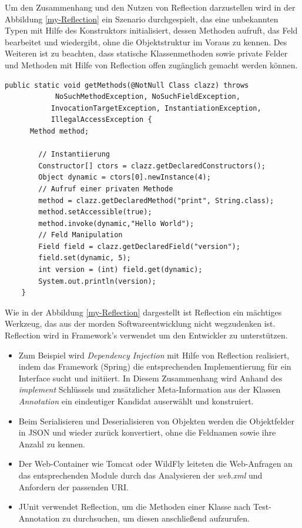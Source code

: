   \bigbreak Um den Zusammenhang und den Nutzen von Reflection darzustellen wird in der Abbildung \ref{my-Reflection} ein Szenario durchgespielt, das eine unbekannten Typen mit Hilfe des Konstruktors initialisiert, dessen Methoden aufruft, das Feld bearbeitet und wiedergibt, ohne die Objektstruktur im Voraus zu kennen. 
  Des Weiteren ist zu beachten, dass statische Klassenmethoden sowie private Felder und Methoden mit Hilfe von Reflection offen zugänglich gemacht werden können.
  \bigbreak 
  \begin{lstlisting}[caption=Reflection in Aktion,label=my-Reflection,captionpos=b]
    public static void getMethods(@NotNull Class clazz) throws
            NoSuchMethodException, NoSuchFieldException,
           InvocationTargetException, InstantiationException,
           IllegalAccessException {
      Method method;

        // Instantiierung
        Constructor[] ctors = clazz.getDeclaredConstructors();
        Object dynamic = ctors[0].newInstance(4);
        // Aufruf einer privaten Methode
        method = clazz.getDeclaredMethod("print", String.class);
        method.setAccessible(true);
        method.invoke(dynamic,"Hello World");
        // Feld Manipulation
        Field field = clazz.getDeclaredField("version");
        field.set(dynamic, 5);
        int version = (int) field.get(dynamic);
        System.out.println(version);
    }
  \end{lstlisting}

  Wie in der Abbildung \ref{my-Reflection} dargestellt ist Reflection ein mächtiges Werkzeug, das aus der morden Softwareentwicklung nicht wegzudenken ist. Reflection wird in Framework's verwendet um den Entwickler zu unterstützen. 
  \begin{itemize}
    \item Zum Beispiel wird \textit{Dependency Injection} mit Hilfe von Reflection realisiert, indem das Framework (Spring) die entsprechenden Implementierung für ein Interface sucht und initiiert. In Diesem Zusammenhang wird Anhand des \textit{implement} Schlüssels und zusätzlicher Meta-Information aus der Klassen \textit{Annotation} ein eindeutiger Kandidat auserwählt und konstruiert.
    \item Beim Serialisieren und Deserialisieren von Objekten werden die Objektfelder in JSON und wieder zurück konvertiert, ohne die Feldnamen sowie ihre Anzahl zu kennen.
    \item Der Web-Container wie Tomcat oder WildFly leiteten die Web-Anfragen an das entsprechenden Module durch das Analysieren der \textit{web.xml} und Anfordern der passenden URI.
    \item JUnit verwendet Reflection, um die Methoden einer Klasse nach Test-Annotation zu durchsuchen, um diesen anschließend aufzurufen.
  \end{itemize}

